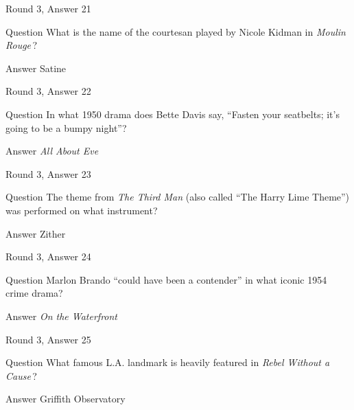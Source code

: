 \documentclass[11pt]{beamer}
\begin{document}
\begin{frame}[t]{Round 3, Answer 21}
\vspace{2em}
\begin{block}{Question}
What is the name of the courtesan played by Nicole Kidman in \emph{Moulin Rouge}\,?
\end{block}
\pause{}
\begin{block}{Answer}
Satine
\end{block}
\end{frame}
    

\begin{frame}[t]{Round 3, Answer 22}
\vspace{2em}
\begin{block}{Question}
In what 1950 drama does Bette Davis say, ``Fasten your seatbelts; it's going to be a bumpy night''?
\end{block}
\pause{}
\begin{block}{Answer}
\emph{All About Eve}
\end{block}
\end{frame}
    

\begin{frame}[t]{Round 3, Answer 23}
\vspace{2em}
\begin{block}{Question}
The theme from \emph{The Third Man} (also called ``The Harry Lime Theme'') was performed on what instrument?
\end{block}
\pause{}
\begin{block}{Answer}
Zither
\end{block}
\end{frame}
    

\begin{frame}[t]{Round 3, Answer 24}
\vspace{2em}
\begin{block}{Question}
Marlon Brando ``could have been a contender'' in what iconic 1954 crime drama?
\end{block}
\pause{}
\begin{block}{Answer}
\emph{On the Waterfront}
\end{block}
\end{frame}
    

\begin{frame}[t]{Round 3, Answer 25}
\vspace{2em}
\begin{block}{Question}
What famous L.A. landmark is heavily featured in \emph{Rebel Without a Cause}\,?
\end{block}
\pause{}
\begin{block}{Answer}
Griffith Observatory
\end{block}
\end{frame}
    
\end{document}
